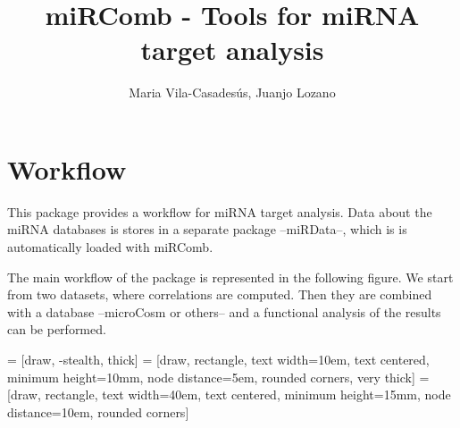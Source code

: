 \documentclass{article}
\title{miRComb - Tools for miRNA target analysis}
\author{Maria Vila-Casadesús, Juanjo Lozano}
\begin{document}
\maketitle


\tableofcontents

\section{Workflow}

This package provides a workflow for miRNA target analysis. Data about the miRNA databases is stores in a separate package --miRData--, which is is automatically loaded with miRComb.

The main workflow of the package is represented in the following figure. We start from two datasets, where correlations are computed. Then they are combined with a database --microCosm or others-- and a functional analysis of the results can be performed.


 = [draw, -stealth, thick]
 = [draw, rectangle, text width=10em, text centered, minimum height=10mm, node distance=5em, rounded corners, very thick]
 = [draw, rectangle, text width=40em, text centered, minimum height=15mm, node distance=10em, rounded corners]
\end{document}

